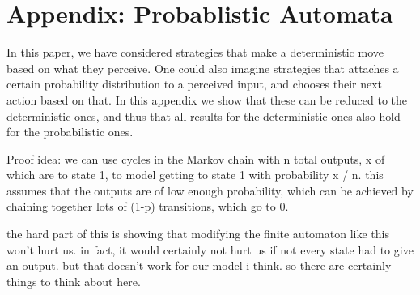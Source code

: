 \documentclass[11pt]{amsart}
\theoremstyle{definition}
\theoremstyle{remark}
\begin{document}
    \section{Appendix: Probablistic Automata}

    In this paper, we have considered strategies that make a deterministic move based on what they perceive. One could also imagine strategies that attaches a certain probability distribution to a perceived input, and chooses their next action based on that. In this appendix we show that these can be reduced to the deterministic ones, and thus that all results for the deterministic ones also hold for the probabilistic ones.

    Proof idea: we can use cycles in the Markov chain with n total outputs, x of which are to state 1, to model getting to state 1 with probability x / n. this assumes that the outputs are of low enough probability, which can be achieved by chaining together lots of (1-p) transitions, which go to 0.

    the hard part of this is showing that modifying the finite automaton like this won't hurt us. in fact, it would certainly not hurt us if not every state had to give an output. but that doesn't work for our model i think. so there are certainly things to think about here.
\end{document}
